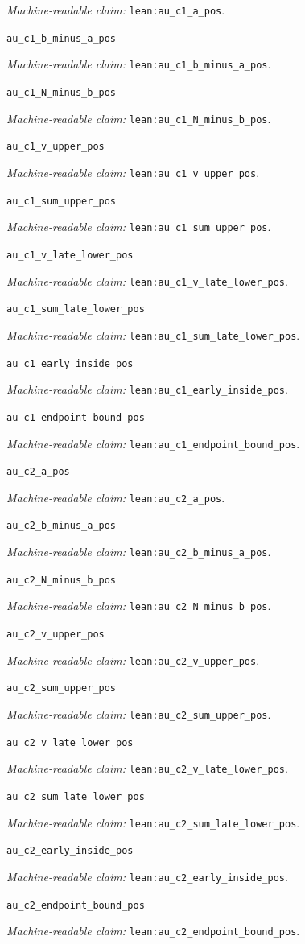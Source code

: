 \documentclass[11pt]{amsart}
\newcommand{\record}[1]{\nolinkurl{#1}}
\newcommand{\claimid}[1]{\par\nopagebreak\noindent\textit{Machine-readable claim:} \record{#1}.\par}
\begin{document}
\claimid{lean:au_c1_a_pos}
\par\noindent\label{lean:au_c1_b_minus_a_pos}\record{au_c1_b_minus_a_pos}
\claimid{lean:au_c1_b_minus_a_pos}
\par\noindent\label{lean:au_c1_N_minus_b_pos}\record{au_c1_N_minus_b_pos}
\claimid{lean:au_c1_N_minus_b_pos}
\par\noindent\label{lean:au_c1_v_upper_pos}\record{au_c1_v_upper_pos}
\claimid{lean:au_c1_v_upper_pos}
\par\noindent\label{lean:au_c1_sum_upper_pos}\record{au_c1_sum_upper_pos}
\claimid{lean:au_c1_sum_upper_pos}
\par\noindent\label{lean:au_c1_v_late_lower_pos}\record{au_c1_v_late_lower_pos}
\claimid{lean:au_c1_v_late_lower_pos}
\par\noindent\label{lean:au_c1_sum_late_lower_pos}\record{au_c1_sum_late_lower_pos}
\claimid{lean:au_c1_sum_late_lower_pos}
\par\noindent\label{lean:au_c1_early_inside_pos}\record{au_c1_early_inside_pos}
\claimid{lean:au_c1_early_inside_pos}
\par\noindent\label{lean:au_c1_endpoint_bound_pos}\record{au_c1_endpoint_bound_pos}
\claimid{lean:au_c1_endpoint_bound_pos}
\par\noindent\label{lean:au_c2_a_pos}\record{au_c2_a_pos}
\claimid{lean:au_c2_a_pos}
\par\noindent\label{lean:au_c2_b_minus_a_pos}\record{au_c2_b_minus_a_pos}
\claimid{lean:au_c2_b_minus_a_pos}
\par\noindent\label{lean:au_c2_N_minus_b_pos}\record{au_c2_N_minus_b_pos}
\claimid{lean:au_c2_N_minus_b_pos}
\par\noindent\label{lean:au_c2_v_upper_pos}\record{au_c2_v_upper_pos}
\claimid{lean:au_c2_v_upper_pos}
\par\noindent\label{lean:au_c2_sum_upper_pos}\record{au_c2_sum_upper_pos}
\claimid{lean:au_c2_sum_upper_pos}
\par\noindent\label{lean:au_c2_v_late_lower_pos}\record{au_c2_v_late_lower_pos}
\claimid{lean:au_c2_v_late_lower_pos}
\par\noindent\label{lean:au_c2_sum_late_lower_pos}\record{au_c2_sum_late_lower_pos}
\claimid{lean:au_c2_sum_late_lower_pos}
\par\noindent\label{lean:au_c2_early_inside_pos}\record{au_c2_early_inside_pos}
\claimid{lean:au_c2_early_inside_pos}
\par\noindent\label{lean:au_c2_endpoint_bound_pos}\record{au_c2_endpoint_bound_pos}
\claimid{lean:au_c2_endpoint_bound_pos}
\end{document}
